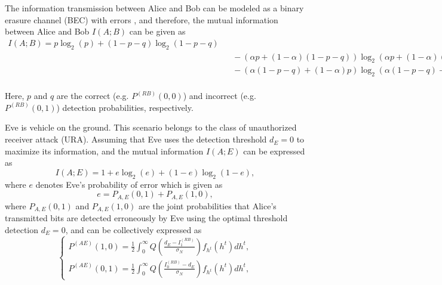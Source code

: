 \documentclass[conference]{IEEEtran}
\begin{document}
The information transmission between Alice and Bob can be modeled as a binary erasure channel (BEC) with errors \cite{Trinh2018}, and therefore, the mutual information between Alice and Bob $I\left ( A;B \right )$ can be given as
\begin{eqnarray}
\nonumber
I\left ( A;B \right )=p\log_{2}\left ( p \right )+\left ( 1-p-q \right )\log_{2}\left ( 1-p-q \right )\\\nonumber
&&\!\!\!\!\!\!\!\!\!\!\!\!\!\!\!\!\!\!\!\!\!\!\!\!\!\!\!\!\!\!\!\!\!\!\!\!\!\!\!\!\!\!\!\!\!\!\!\!\!\!\!\!\!\!\!\!\!\!\!\!\!\!\!\!\!\!\!\!\!\!\!\!\!\!\!\!\!\!\!\!\!\!\!\!\!\!\!\!\!\!\!\!\!\!\!\!\!\!\!\!\!\!\!\!\!\!\!\!\!\!\!\!\!\!\!\!\!\!\!\!\!\!\!\!\!\!\!\!\!\!\!\!\!\!\!\!\!\!\!\!\!\!-\left ( \alpha p+\left ( 1-\alpha \right )\left ( 1-p-q \right ) \right )\log_{2}\left ( \alpha p+\left ( 1-\alpha \right )\left ( 1-p-q \right ) \right )\\
&&\!\!\!\!\!\!\!\!\!\!\!\!\!\!\!\!\!\!\!\!\!\!\!\!\!\!\!\!\!\!\!\!\!\!\!\!\!\!\!\!\!\!\!\!\!\!\!\!\!\!\!\!\!\!\!\!\!\!\!\!\!\!\!\!\!\!\!\!\!\!\!\!\!\!\!\!\!\!\!\!\!\!\!\!\!\!\!\!\!\!\!\!\!\!\!\!\!\!\!\!\!\!\!\!\!\!\!\!\!\!\!\!\!\!\!\!\!\!\!\!\!\!\!\!\!\!\!\!\!\!\!\!\!\!\!\!\!\!\!\!\!\!-\left ( \alpha \left ( 1-p-q \right )+\left ( 1-\alpha \right )p \right )\log_{2}\left ( \alpha \left ( 1-p-q \right )+\left ( 1-\alpha \right )p \right ).\nonumber\\
\end{eqnarray}

Here, $p$ and $q$ are the correct (e.g. $P^{\left ( RB \right )}\left ( 0,0 \right )$) and incorrect  (e.g. $P^{\left ( RB \right )}\left ( 0,1 \right )$) detection probabilities, respectively.

Eve is vehicle on the ground. This scenario belongs to the class of unauthorized receiver attack (URA). Assuming that Eve uses the detection threshold $d_{E}=0$ to maximize its information, and the mutual information $I\left ( A;E \right )$ can be expressed as
\begin{equation}
	I\left ( A;E \right )=1+e\log_{2}\left ( e \right )+\left ( 1-e \right )\log_{2}\left ( 1-e \right ),
\end{equation}
where $e$ denotes Eve's probability of error which is given as
\begin{equation}
	e=P_{A,E}\left ( 0,1 \right )+P_{A,E}\left ( 1,0 \right ),
\end{equation}
where $P_{A,E}\left ( 0,1 \right )$ and $P_{A,E}\left ( 1,0 \right )$ are the joint probabilities that Alice's transmitted bits are detected erroneously by Eve using the optimal threshold detection $d_{E}=0$, and can be collectively expressed as
\begin{equation}
\!
\begin{cases}
P^{(AE)}(1,0)=\frac{1}{2}\int_{0}^{\infty }Q\left ( \frac{d_E-I_1^{(RB)}}{\sigma_N} \right )f_{h^t}(h^t)dh^t, \\
P^{(AE)}(0,1)=\frac{1}{2}\int_{0}^{\infty }Q\left ( \frac{I_0^{(RB)}-d_E}{\sigma_N} \right )f_{h^t}(h^t)dh^t,
\end{cases}
\end{equation}
\end{document}
